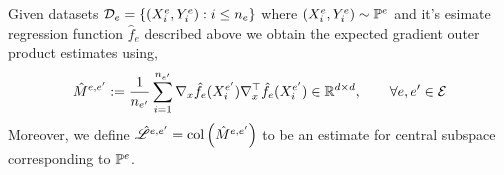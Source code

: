 \begin{definition}
    \label{def:egop-per-env}
    Given datasets $\dataset[e] = \left\{ (X_i^e, Y_i^e): i \leq n_e \right\}$ where $(X_i^e, Y_i^e) \sim \probability[e]$ and it's esimate regression function $\hat{f}_e$ described above we obtain the expected gradient outer product estimates using,
    $$ \hat{M}^{e,e'} := \frac{1}{n_{e'}} \sum_{i=1}^{n_{e'}} \nabla_x \hat{f}_{e}(X_i^{e'}) \nabla^{\T}_x \hat{f}_{e}(X_i^{e'}) \in \mathbb{R}^{d \times d}, \quad\quad \forall e,e' \in \environments $$
    Moreover, we define $\hat{\mathscr{L}}^{e,e'} = \col\left( \hat{M}^{e,e'} \right)$ to be an estimate for central subspace corresponding to $\probability[e]$.
\end{definition}

